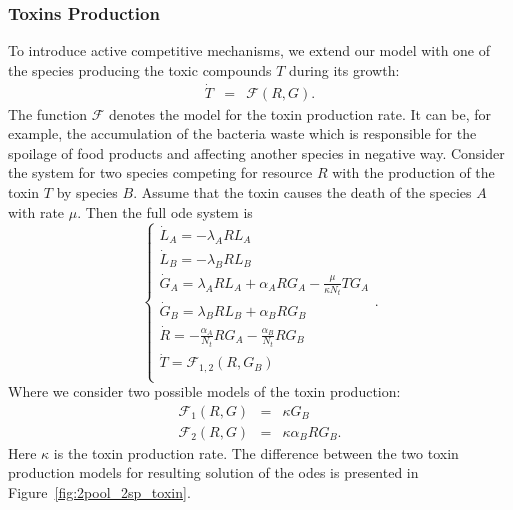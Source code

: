 \documentclass[10pt,A4paper]{article}
\begin{document}
\subsubsection{Toxins Production}
To introduce active competitive mechanisms, we extend our model with one of the species producing the toxic compounds $T$ during its growth:
\begin{eqnarray}
    \dot{T} &=& \mathcal{F}(R,G).
\end{eqnarray}
The function $\mathcal{F}$ denotes the model for the toxin production rate.
It can be, for example, the accumulation of the bacteria waste which is responsible for the spoilage of food products and affecting another species in negative way.
Consider the system for two species competing for resource $R$ with the production of the toxin $T$ by species $B$.
Assume that the toxin causes the death of the species $A$ with rate $\mu$.
Then the full \ac{ode} system is
\begin{equation}
    \begin{cases}
        \dot{L}_A = - \lambda_A R L_A\\
        \dot{L}_B = - \lambda_B R L_B \\
        \dot{G}_A = \lambda_A R L_A + \alpha_A R G_A - \frac{\mu}{\kappa N_t} T G_A\\
        \dot{G}_B = \lambda_B R L_B + \alpha_B R G_B\\
        \dot{R} = -\frac{\alpha_A}{N_t} R G_A-\frac{\alpha_B}{N_t} R G_B\\
        \dot{T} = \mathcal{F}_{1,2} (R, G_B) \\
    \end{cases}.
    \label{eq:model_2sp_toxin}
\end{equation}
%
Where we consider two possible models of the toxin production:
\begin{eqnarray}
    \mathcal{F}_1(R,G)&=&\kappa G_B\\
    \mathcal{F}_2(R,G)&=&\kappa\alpha_B R G_B.
\end{eqnarray}
Here $\kappa$ is the toxin production rate.
The difference between the two toxin production models for resulting solution of the \acp{ode} is presented in Figure~\ref{fig:2pool_2sp_toxin}.
%
%
\end{document}
